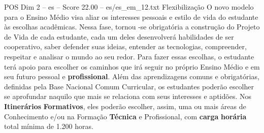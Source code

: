 \begin{textsample}{POS Dim 2 – es – Score 22.00 – es/es\_em\_12.txt}  \label{ex:f2_pos_212}
Flexibilização O novo modelo para o Ensino Médio visa aliar os interesses pessoais e estilo de vida do estudante às escolhas acadêmicas.
Nessa fase, tornou -se obrigatória a construção do Projeto de Vida de cada estudante, cada um deles desenvolverá habilidades de ser cooperativo, saber defender suas ideias, entender as tecnologias, compreender, respeitar e analisar o mundo ao seu redor.
Para fazer essas escolhas, o estudante terá apoio para escolher os caminhos que irá seguir no próprio Ensino Médio e em seu futuro pessoal e \textbf{profissional}.
Além das aprendizagens comuns e obrigatórias, definidas pela Base Nacional Comum Curricular, os estudantes poderão escolher se aprofundar naquilo que mais se relaciona com seus interesses e aptidões.
Nos \textbf{Itinerários} \textbf{Formativos}, eles poderão escolher, assim, uma ou mais áreas de Conhecimento e/ou na Formação \textbf{Técnica} e Profissional, com \textbf{carga} \textbf{horária} total mínima de 1.200 horas.

\end{textsample}
